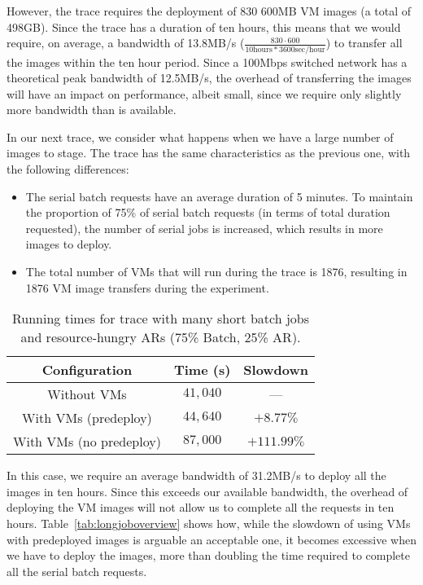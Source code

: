 However, the trace requires the deployment of 830 600MB VM images (a total of 498GB). Since the trace has a duration of ten hours, this means that we would require, on average, a bandwidth of 13.8MB/s ($\frac{830\cdot 600}{10\textrm{hours}*3600\textrm{sec/hour}}$) to transfer all the images within the ten hour period. Since a 100Mbps switched network has a theoretical peak bandwidth of 12.5MB/s, the overhead of transferring the images will have an impact on performance, albeit small, since we require only slightly more bandwidth than is available.

In our next trace, we consider what happens when we have a large number of images to stage. The trace has the same characteristics as the previous one, with the following differences:

\begin{itemize}
\item The serial batch requests have an average duration of 5 minutes. To maintain the proportion of 75\% of serial batch requests (in terms of total duration requested), the number of serial jobs is increased, which results in more images to deploy.
\item The total number of VMs that will run during the trace is 1876, resulting in 1876 VM image transfers during the experiment. 
\end{itemize}

\begin{table}
\begin{center}
\caption{Running times for trace with many short batch jobs and resource-hungry ARs (75\% Batch, 25\% AR).}
\begin{tabular}{|c|c|c|}
\hline
 \textbf{Configuration} & \textbf{Time (s)} & \textbf{Slowdown} \\\hline\hline
Without VMs & $41,040$ & --- \\\hline
With VMs (predeploy) & $44,640$ & $+8.77\%$ \\\hline 
With VMs (no predeploy) & $87,000$ & $+111.99\%$ \\\hline
\end{tabular}
\label{tab:shortjoboverview}
\end{center}
\end{table}


In this case, we require an average bandwidth of 31.2MB/s to deploy all the images in ten hours. Since this exceeds our available bandwidth, the overhead of deploying the VM images will not allow us to complete all the requests in ten hours. Table~\ref{tab:longjoboverview} shows how, while the slowdown of using VMs with predeployed images is arguable an acceptable one, it becomes excessive when we have to deploy the images, more than doubling the time required to complete all the serial batch requests.

